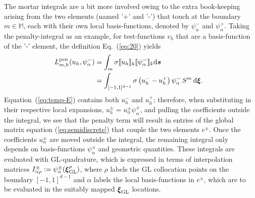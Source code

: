   The mortar integrals are a bit more
  involved owing to the extra book-keeping arising from the two elements (named '+' and '-') that touch at the boundary $m\in\mathbb{M}$, each with their own local basis-functions,
  denoted by $\psi^-_\alpha$ and $\psi^+_\alpha$.  Taking the penalty-integral as an example, for test-functions $v_h$ that are a basis-function of the '-' element, the definition Eq.~(\ref{eq:20}) yields
\begin{align}
  L^{\text{pen}}_{m,h}(u_h, \psi^-_\alpha) 
  &= \int
  _{m}\sigma \llbracket u_h \rrbracket_k \llbracket \psi^-_\alpha \rrbracket_k \mathrm{d}\boldsymbol{s} \\
\label{eq:temp-E}
  &= \int
  _{[-1,1]^{d-1}}\sigma \left(u_h^{-} - u_h^{+}\right)\psi^-_\alpha\,S^m\,\mathrm{d}\boldsymbol{\xi}.
\end{align}
Equation~(\ref{eq:temp-E}) contains both $u_h^-$ and $u_h^+$;
therefore, when substituting in their respective local expansions,
$u_h^{\pm}=u_\alpha^\pm \psi_\alpha^\pm$, and pulling the coefficients
outside the integral, we see that the penalty term will result in
entries of the global matrix equation (\ref{eq:semidiscrete}) that
couple the two elements $e^\pm$.  Once the coefficients $u_\alpha^\pm$
are moved outside the integral, the remaining integral only depends on
basis-functions $\psi_\alpha^\pm$ and geometric quantities.  These integrals are
evaluated with GL-quadrature, which is expressed in terms of interpolation matrices $I_{\alpha\rho}^\pm :=\psi^\pm_\alpha(\boldsymbol{\xi}^\rho_{\rm GL})$, where  $\rho$ labels the GL collocation points on the boundary $[-1,1]^{d-1}$ and $\alpha$ labels the local basis-functions in $e^\pm$, which are to be evaluated in the suitably mapped $\boldsymbol{\xi}_{\rm GL}$ locations.
% 
%

%

